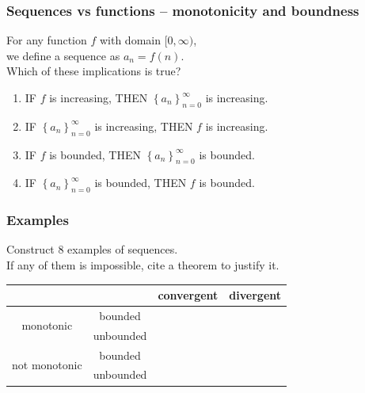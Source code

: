 \documentclass[14pt]{beamer}
\begin{document}
\begin{frame}[t]
	\frametitle{Sequences vs functions -- monotonicity and boundness}

	For any function $f$ with domain $[0, \infty)$, \\ we define a sequence as $a_{n}
	= f(n)$. \\ Which of these implications is true?

	\begin{enumerate}
		\item IF $f$ is increasing, THEN
			$\displaystyle \left\{ a_{n} \right\}_{n=0}^{\infty}$ is increasing.
			\vfill

		\item IF $\displaystyle \left\{ a_{n} \right\}_{n=0}^{\infty}$ is increasing,
			THEN $f$ is increasing.
			\vfill

		\item IF $f$ is bounded, THEN
			$\displaystyle \left\{ a_{n} \right\}_{n=0}^{\infty}$ is bounded.
			\vfill

		\item IF $\displaystyle \left\{ a_{n} \right\}_{n=0}^{\infty}$ is bounded,
			THEN $f$ is bounded.
			\vfill
	\end{enumerate}
\end{frame}

\begin{frame}[t]
	\fontsize{13}{13}\selectfont
	\frametitle{Examples}

	Construct 8 examples of sequences. \\ If any of them is impossible, cite a theorem
	to justify it.

	\begin{center}
		\begin{tabular}{|c|c|c|c|}
			\hline
			                               &           & convergent                                               & divergent                                                \\
			\hline
			\multirow{2}{*}{monotonic}     & bounded   & \phantom{$\displaystyle \int_{\dfrac 11}^{9}$ ???????? } & \phantom{$\displaystyle \int_{\dfrac 11}^{9}$ ???????? } \\
			\cline{2-4}                    & unbounded & \phantom{$\displaystyle \int_{\dfrac 11}^{9}$ ???????? } & \phantom{$\displaystyle \int_{\dfrac 11}^{9}$ ???????? } \\
			\hline
			\multirow{2}{*}{not monotonic} & bounded   & \phantom{$\displaystyle \int_{\dfrac 11}^{9}$ ???????? } & \phantom{$\displaystyle \int_{\dfrac 11}^{9}$ ???????? } \\
			\cline{2-4}                    & unbounded & \phantom{$\displaystyle \int_{\dfrac 11}^{9}$ ???????? } & \phantom{$\displaystyle \int_{\dfrac 11}^{9}$ ???????? } \\
			\hline
		\end{tabular}
	\end{center}
\end{frame}
\end{document}
